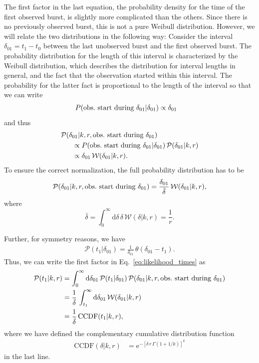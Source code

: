 \documentclass[fleqn,usenatbib]{mnras}
\newcommand{\new}[1]{#1}
\renewcommand{\d}{\delta}
\begin{document}
The first factor in the last equation, the probability density for the time of the first observed burst, is slightly more complicated than the others. Since there is no previously observed burst, this is not a pure Weibull distribution. However, we will relate the two distributions in the following way: Consider the interval $\d_{01} = t_1 - t_0$ between the last unobserved burst and the first observed burst. The probability distribution for the length of this interval is characterized by the Weibull distribution, which describes the distribution for interval lengths in general, and the fact that the observation started within this interval. The probability for the latter fact is proportional to the length of the interval so that we can write
\begin{align}
	P(\textnormal{obs.\ start during }\d_{01} | \d_{01}) &\propto \d_{01}
\end{align}
and thus
\begin{align}
	&\mathcal{P}(\d_{01}|k,r,\textnormal{obs.\ start during }\d_{01})\nonumber\\
	&~~~~~\propto P(\textnormal{obs.\ start during }\d_{01}|\d_{01}) \, \mathcal{P}(\d_{01}|k,r)\nonumber\\
	&~~~~~\propto \d_{01} \, \mathcal{W}(\d_{01}|k,r).
\end{align}
To ensure the correct normalization, the full probability distribution has to be
\begin{align}
	\mathcal{P}(\d_{01}|k,r,\textnormal{obs.\ start during }\d_{01}) = \frac{\d_{01}}{\bar{\d}} \, \mathcal{W}(\d_{01}|k,r),
\end{align}
where
\begin{equation}
	\label{eq:dbar_weibull}
	\bar{\d} = \int_0^\infty \mathrm{d}\d \, \d \, \mathcal{W}(\d|k,r) = \frac{1}{r}.
\end{equation}

Further, for symmetry reasons, we have
\begin{align}
 \mathcal{P}(t_1|\d_{01}) = \frac{1}{\d_{01}} \, \theta(\d_{01} - t_1).
\end{align}
Thus, we can write the first factor in Eq.~\eqref{eq:likelihood_times} as
\begin{align}
	\mathcal{P}(t_1|k,r) &= \int_0^\infty \mathrm{d}\d_{01} \, \mathcal{P}(t_1|\d_{01}) \, \mathcal{P}(\d_{01}|k,r,\textnormal{obs.\ start during }\d_{01})\nonumber\\
	&= \frac{1}{\bar{\d}} \, \int_{t_1}^\infty \mathrm{d}\d_{01} \, \mathcal{W}(\d_{01}|k,r)\nonumber\\
	&= \frac{1}{\bar{\d}} \, \mathrm{CCDF}(t_1|k,r),
\end{align}
where we have defined the complementary cumulative distribution function
\begin{align}
	\label{eq:cdf_weibull}
	\mathrm{CCDF}(\d|k,r) &= \mathrm{e}^{-\left[\d\,r\,\Gamma(1 + 1/k)\right]^k}
\end{align}
in the last line.
\end{document}
